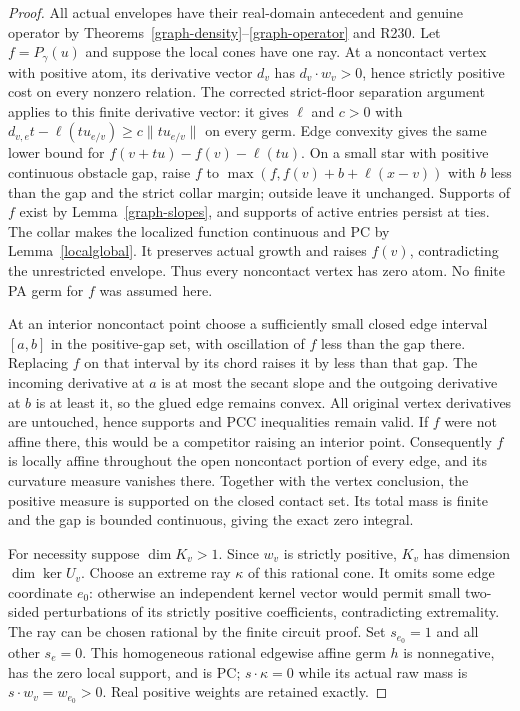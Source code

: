 \begin{proof}
All actual envelopes have their real-domain antecedent and genuine
operator by Theorems~\ref{graph-density}--\ref{graph-operator} and R230.
Let $f=P_\gamma(u)$ and suppose the local cones have one ray.
At a noncontact vertex with positive atom, its derivative vector $d_v$
has $d_v\cdot w_v>0$, hence strictly positive cost on every nonzero
relation. The corrected strict-floor separation argument applies to
this finite derivative vector: it gives $\ell$ and $c>0$ with
$d_{v,e}t-\ell(tu_{e/v})\geq c\|tu_{e/v}\|$ on every germ.
Edge convexity gives the same lower bound for
$f(v+tu)-f(v)-\ell(tu)$. On a small star with positive continuous
obstacle gap, raise $f$ to
$\max(f,f(v)+b+\ell(x-v))$ with $b$ less than the gap and the strict
collar margin; outside leave it unchanged. Supports of $f$ exist by
Lemma~\ref{graph-slopes}, and supports of active entries persist at
ties. The collar makes the localized function continuous and PC by
Lemma~\ref{localglobal}. It preserves actual growth and raises $f(v)$,
contradicting the unrestricted envelope. Thus every noncontact vertex
has zero atom. No finite PA germ for $f$ was assumed here.

At an interior noncontact point choose a sufficiently small closed
edge interval $[a,b]$ in the positive-gap set, with oscillation of $f$
less than the gap there. Replacing $f$ on that interval by its chord
raises it by less than that gap. The incoming derivative at $a$ is
at most the secant slope and the outgoing derivative at $b$ is at
least it, so the glued edge remains convex. All original vertex
derivatives are untouched, hence supports and PCC inequalities remain
valid. If $f$ were not affine there, this would be a competitor raising
an interior point. Consequently $f$ is locally affine throughout the
open noncontact portion of every edge, and its curvature measure
vanishes there. Together with the vertex conclusion, the positive
measure is supported on the closed contact set. Its total mass is
finite and the gap is bounded continuous, giving the exact zero integral.

For necessity suppose $\dim K_v>1$. Since $w_v$ is strictly positive,
$K_v$ has dimension $\dim\ker U_v$. Choose an extreme ray $\kappa$
of this rational cone. It omits some edge coordinate $e_0$:
otherwise an independent kernel vector would permit small two-sided
perturbations of its strictly positive coefficients, contradicting
extremality. The ray can be chosen rational by the finite circuit proof.
Set $s_{e_0}=1$ and all other $s_e=0$. This homogeneous rational
edgewise affine germ $h$ is nonnegative, has the zero local support,
and is PC; $s\cdot\kappa=0$ while its actual raw mass is
$s\cdot w_v=w_{e_0}>0$. Real positive weights are retained exactly.


\end{proof}
